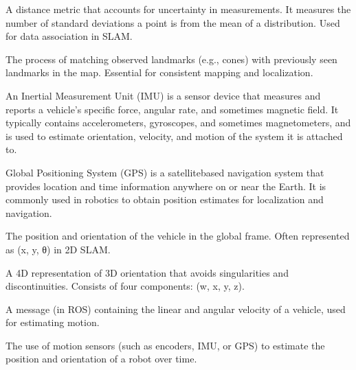 \documentclass[letterpaper,10pt,english]{sphinxmanual}
\begin{document}
\begin{description}
\sphinxAtStartPar
A distance metric that accounts for uncertainty in measurements. It measures the number of standard deviations a point is from the mean of a distribution. Used for data association in SLAM.

\sphinxAtStartPar
The process of matching observed landmarks (e.g., cones) with previously seen landmarks in the map. Essential for consistent mapping and localization.

\sphinxAtStartPar
An Inertial Measurement Unit (IMU) is a sensor device that measures and reports a vehicle’s specific force, angular rate, and sometimes magnetic field. It typically contains accelerometers, gyroscopes, and sometimes magnetometers, and is used to estimate orientation, velocity, and motion of the system it is attached to.

\sphinxAtStartPar
Global Positioning System (GPS) is a satellite\sphinxhyphen{}based navigation system that provides location and time information anywhere on or near the Earth. It is commonly used in robotics to obtain position estimates for localization and navigation.

\sphinxAtStartPar
The position and orientation of the vehicle in the global frame. Often represented as (x, y, θ) in 2D SLAM.

\sphinxAtStartPar
A 4D representation of 3D orientation that avoids singularities and discontinuities. Consists of four components: (w, x, y, z).

\sphinxAtStartPar
A message (in ROS) containing the linear and angular velocity of a vehicle, used for estimating motion.

\sphinxAtStartPar
The use of motion sensors (such as encoders, IMU, or GPS) to estimate the position and orientation of a robot over time.


\end{description}
\end{document}
